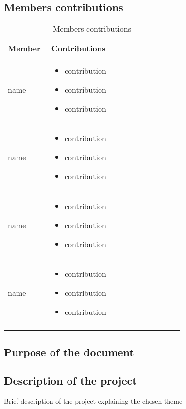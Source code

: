 \subsection{Members contributions}
\begin{longtable}
    {|m{0.23\linewidth}|m{0.7\linewidth}|}
            \hline
            \textbf{Member} & \textbf{Contributions}\\
            \hline
            \endhead
                name & \begin{itemize}
                    \item contribution
                    \item contribution
                    \item contribution
                \end{itemize} \\
            \hline
                 name & \begin{itemize}
                    \item contribution
                    \item contribution
                    \item contribution
                \end{itemize} \\
            \hline
                 name & \begin{itemize}
                    \item contribution
                    \item contribution
                    \item contribution
                \end{itemize} \\
            \hline
                name & \begin{itemize}
                    \item contribution
                    \item contribution
                    \item contribution
                \end{itemize} \\
            \hline
            \caption{Members contributions}
            \label{table:mem_contributions}
\end{longtable}

\subsection{Purpose of the document}

\subsection{Description of the project}
Brief description of the project explaining the chosen theme
